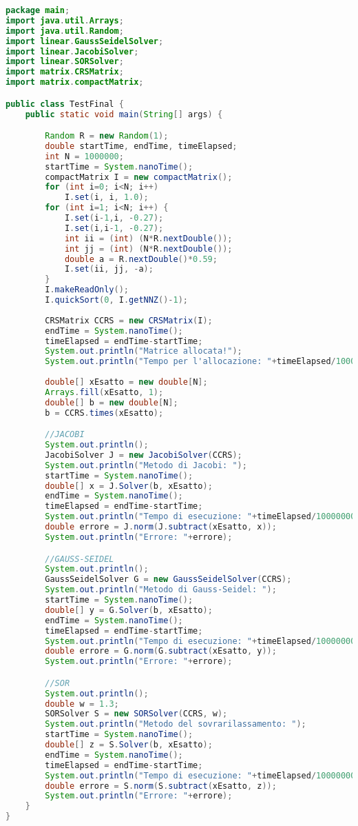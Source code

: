 \documentclass[12pt]{article}
\begin{document}
\newpage
\begin{lstlisting}[language=Java]
package main;
import java.util.Arrays;
import java.util.Random;
import linear.GaussSeidelSolver;
import linear.JacobiSolver;
import linear.SORSolver;
import matrix.CRSMatrix;
import matrix.compactMatrix;

public class TestFinal {
	public static void main(String[] args) {

		Random R = new Random(1);
		double startTime, endTime, timeElapsed;
		int N = 1000000;
		startTime = System.nanoTime();
		compactMatrix I = new compactMatrix();
		for (int i=0; i<N; i++)
			I.set(i, i, 1.0);
		for (int i=1; i<N; i++) {
			I.set(i-1,i, -0.27);
			I.set(i,i-1, -0.27);
			int ii = (int) (N*R.nextDouble());
			int jj = (int) (N*R.nextDouble());
			double a = R.nextDouble()*0.59;
			I.set(ii, jj, -a);
		}
		I.makeReadOnly();
		I.quickSort(0, I.getNNZ()-1);
		
		CRSMatrix CCRS = new CRSMatrix(I);
		endTime = System.nanoTime();
		timeElapsed = endTime-startTime;
		System.out.println("Matrice allocata!");
		System.out.println("Tempo per l'allocazione: "+timeElapsed/1000000000+" secondi");
		
		double[] xEsatto = new double[N];
		Arrays.fill(xEsatto, 1);
		double[] b = new double[N];
		b = CCRS.times(xEsatto);	

		//JACOBI
		System.out.println();
		JacobiSolver J = new JacobiSolver(CCRS);
		System.out.println("Metodo di Jacobi: ");
		startTime = System.nanoTime();
		double[] x = J.Solver(b, xEsatto);
		endTime = System.nanoTime();
		timeElapsed = endTime-startTime;
		System.out.println("Tempo di esecuzione: "+timeElapsed/1000000000+" secondi");
		double errore = J.norm(J.subtract(xEsatto, x));
		System.out.println("Errore: "+errore);

		//GAUSS-SEIDEL
		System.out.println();
		GaussSeidelSolver G = new GaussSeidelSolver(CCRS);
		System.out.println("Metodo di Gauss-Seidel: ");
		startTime = System.nanoTime();
		double[] y = G.Solver(b, xEsatto);
		endTime = System.nanoTime();
		timeElapsed = endTime-startTime;
		System.out.println("Tempo di esecuzione: "+timeElapsed/1000000000+" secondi");
		double errore = G.norm(G.subtract(xEsatto, y));
		System.out.println("Errore: "+errore);

		//SOR
		System.out.println();
		double w = 1.3;
		SORSolver S = new SORSolver(CCRS, w);
		System.out.println("Metodo del sovrarilassamento: ");
		startTime = System.nanoTime();
		double[] z = S.Solver(b, xEsatto);
		endTime = System.nanoTime();
		timeElapsed = endTime-startTime;
		System.out.println("Tempo di esecuzione: "+timeElapsed/1000000000+" secondi");
		double errore = S.norm(S.subtract(xEsatto, z));
		System.out.println("Errore: "+errore);
	}
}
\end{lstlisting}
\end{document}
